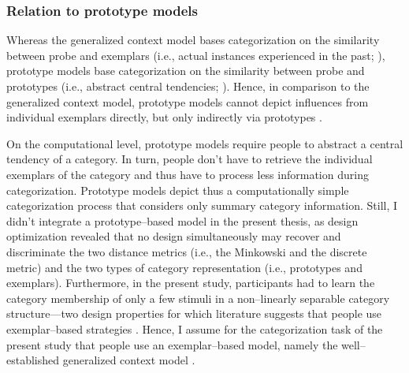 \documentclass[a4paper,man,natbib]{apa6}
\begin{document}
\subsubsection{Relation to prototype models}
Whereas the generalized context model bases categorization on the similarity between probe and exemplars (i.e., actual instances experienced in the past; \citealp{medin1978context, nosofsky1986attention}), prototype models base categorization on the similarity between probe and prototypes (i.e., abstract central tendencies; \citealp{posner1968genesis}). Hence, in comparison to the generalized context model, prototype models cannot depict influences from individual exemplars directly, but only indirectly via prototypes \citep{nosofsky2011generalized, nosofsky1992exemplars, medin1978context}.

On the computational level, prototype models require people to abstract a central tendency of a category. In turn, people don't have to retrieve the individual exemplars of the category and thus have to process less information during categorization. Prototype models depict thus a computationally simple categorization process that considers only summary category information.
Still, I didn't integrate a prototype--based model in the present thesis, as design optimization revealed that no design simultaneously may recover and discriminate the two distance metrics (i.e., the Minkowski and the discrete metric) and the two types of category representation (i.e., prototypes and exemplars). Furthermore, in the present study, participants had to learn the category membership of only a few stimuli in a non--linearly separable category structure---two design properties for which literature suggests that people use exemplar--based strategies \citep{smith1998prototypes, smith2000thirty}. Hence, I assume for the categorization task of the present study that people use an exemplar--based model, namely the well--established generalized context model \citep{nosofsky1986attention}.
\end{document}
